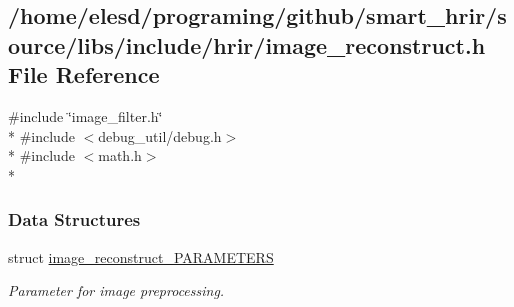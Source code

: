 \hypertarget{a00013}{\subsection{/home/elesd/programing/github/smart\-\_\-hrir/source/libs/include/hrir/image\-\_\-reconstruct.h File Reference}
\label{a00013}
}
{\ttfamily \#include \char`\"{}image\-\_\-filter.\-h\char`\"{}}\\*
{\ttfamily \#include $<$debug\-\_\-util/debug.\-h$>$}\\*
{\ttfamily \#include $<$math.\-h$>$}\\*
\subsubsection*{Data Structures}
\begin{DoxyCompactItemize}
\item 
struct \hyperlink{a00005}{image\-\_\-reconstruct\-\_\-\-P\-A\-R\-A\-M\-E\-T\-E\-R\-S}
\begin{DoxyCompactList}\small\item\em Parameter for image preprocessing. \end{DoxyCompactList}\end{DoxyCompactItemize}
